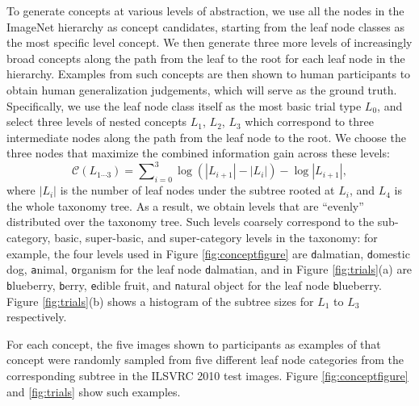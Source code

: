 To generate concepts at various levels of abstraction, we use all the nodes in the ImageNet hierarchy as concept candidates, starting from the leaf node classes as the most specific level concept. We then generate three more levels of increasingly broad concepts along the path from the leaf to the root for each leaf node in the hierarchy. Examples from such concepts are then shown to human participants to obtain human generalization judgements, which will serve as the ground truth. Specifically, we use the leaf node class itself as the most basic trial type $L_0$, and select three levels of nested concepts $L_1$, $L_2$, $L_3$ which correspond to three intermediate nodes along the path from the leaf node to the root. We choose the three nodes that maximize the combined information gain across these levels:
\begin{equation}
    \mathcal{C}(L_{1\cdots 3}) = \sum\nolimits_{i=0}^{3} \log(|L_{i+1}| - |L_{i}|) - \log|L_{i+1}|,
\end{equation}
where $|L_i|$ is the number of leaf nodes under the subtree rooted at $L_i$, and $L_4$ is the whole taxonomy tree. As a result, we obtain levels that are ``evenly'' distributed over the taxonomy tree. Such levels coarsely correspond to the sub-category, basic, super-basic, and super-category levels in the taxonomy: for example, the four levels used in Figure \ref{fig:conceptfigure} are {\texttt dalmatian}, {\texttt domestic dog}, {\texttt animal}, {\texttt organism} for the leaf node {\texttt dalmatian}, and in Figure \ref{fig:trials}(a) are {\texttt blueberry}, {\texttt berry}, {\texttt edible fruit}, and {\texttt natural object} for the leaf node {\texttt blueberry}. Figure \ref{fig:trials}(b) shows a histogram of the subtree sizes for $L_1$ to $L_3$ respectively. 

For each concept, the five images shown to participants as examples of that concept were randomly sampled from five different leaf node categories from the corresponding subtree in the ILSVRC 2010 test images. Figure \ref{fig:conceptfigure} and \ref{fig:trials} show such examples.

